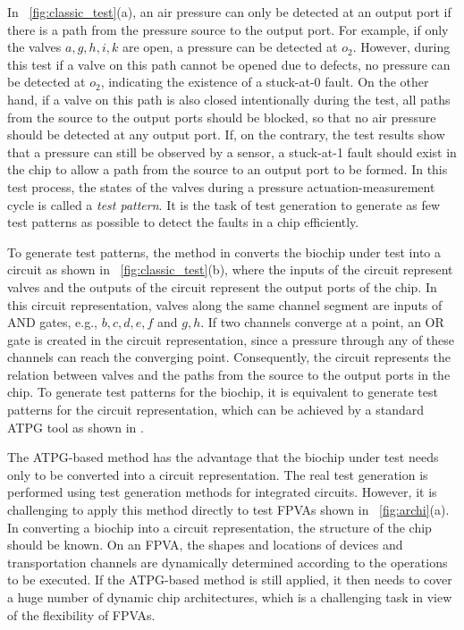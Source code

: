 \documentclass[journal,twoside]{IEEEtran}
\begin{document}
In \figname~\ref{fig:classic_test}(a), an air pressure can only be detected at
an output port if there is a path from the pressure source to the output port. For example,
if only the valves $a, g, h, i, k$ are open,  a pressure can be detected
at $o_2$. However, during this test if a valve on this path cannot be opened due to
defects, no pressure can be detected at $o_2$, indicating the
existence of a stuck-at-0 fault. On the other hand, if a valve on this path is also
closed intentionally during the test, all paths from the source to the output
ports should be blocked,
so that no air pressure should be detected at any output port. If, on the
contrary, the test results show that a pressure can still be observed by a
sensor, a stuck-at-1 fault should exist in the chip to allow a path from the
source to an output port to be formed. In this test process,   
the states of the valves during a pressure actuation-measurement cycle is
called a \textit{test pattern}. It is the task of test generation to generate
as few test patterns as possible to detect the faults in a chip efficiently.

To generate test patterns, the method in \cite{HuYHC14} converts the
biochip under test into a circuit as shown in
\figname~\ref{fig:classic_test}(b), where the inputs of the circuit
represent valves and the outputs of the circuit represent the output ports
of the chip. In this circuit representation, valves along the same
channel segment are inputs of AND gates, e.g., $b, c, d, e, f$ and $g,
h$. If two channels converge at a point, 
an OR gate is created in the circuit representation, since a pressure through
any of these channels can reach the converging point. Consequently, 
the circuit represents the relation between valves and the paths from the source to
the output ports in the chip.
To generate test patterns for the biochip, it is
equivalent to generate test patterns for the circuit representation, which can
be achieved by a standard ATPG tool as shown in \cite{HuYHC14}.


The ATPG-based method has the advantage that the biochip under test needs only
to be converted into a circuit representation. The real test generation is
performed using test generation methods for integrated circuits.
However, it is challenging to apply this method directly to test FPVAs
shown in \figname~\ref{fig:archi}(a).  
In converting a biochip into a circuit representation, the structure of the chip
should be known.
On an FPVA, the shapes and locations of devices and transportation
channels are dynamically determined according to the operations to be executed.
If the ATPG-based method is still applied, it then needs to cover 
a huge number of dynamic chip architectures, which is 
a challenging task in view of the flexibility of FPVAs.
\end{document}
